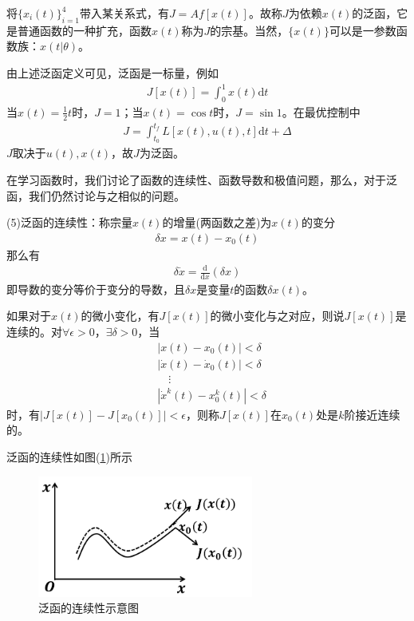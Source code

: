             将$\{x_i(t)\}_{i=1}^4$带入某关系式，有$J = Af[x(t)]$。故称$J$为依赖$x(t)$的泛函，它是普通函数的一种扩充，函数$x(t)$称为$J$的宗基。当然，$\{x(t)\}$可以是一参数函数族：$x(t|\theta)$。
            \par
            由上述泛函定义可见，泛函是一标量，例如
            \begin{align*}
            J[x(t)] = \int_0^1x(t)\mathrm{d}t
            \end{align*}
            当$x(t) = \frac{1}{2}t$时，$J=1$；当$x(t) = \cos t$时，$J = \sin 1$。在最优控制中
            \begin{align*}
            J = \int_{t_0}^{t_f}L[x(t),u(t),t]\mathrm{d}t + \Delta
            \end{align*}
            $J$取决于$u(t),x(t)$，故$J$为泛函。
            \par
            在学习函数时，我们讨论了函数的连续性、函数导数和极值问题，那么，对于泛函，我们仍然讨论与之相似的问题。
            \par
            (5)泛函的连续性：称宗量$x(t)$的增量(两函数之差)为$x(t)$的变分
            \begin{align*}
            \delta x = x(t) - x_0(t)
            \end{align*}
            那么有
            \begin{align*}
            \delta\dot{x} = \frac{\mathrm{d}}{\mathrm{d}x} (\delta x)
            \end{align*}
            即导数的变分等价于变分的导数，且$\delta x$是变量$t$的函数$\delta x(t)$。
            \begin{definition}[泛函的连续性]
            如果对于$x(t)$的微小变化，有$J[x(t)]$的微小变化与之对应，则说$J[x(t)]$是连续的。对$\forall \epsilon >0$，$\exists \delta >0$，当
            \begin{align*}
            & |x(t) - x_0(t)| < \delta\\
            & | \dot{x}(t) - \dot{x}_0(t) |<\delta\\
            & \quad \vdots\\
            & | \dot{x}^k(t) - x_0^k(t) | < \delta
            \end{align*}
            时，有$|J[x(t)] - J[x_0(t)]  |<\epsilon$，则称$J[x(t)]$在$x_0(t)$处是$k$阶接近连续的。
            \end{definition}
            \par
            泛函的连续性如图(\ref{fig:泛函的连续性示意图})所示
            \begin{figure}[H]
            \centering
            \includegraphics[height=4cm]{images/continuity_of_function_diagram.jpg}
            \caption{泛函的连续性示意图}
            \label{fig:泛函的连续性示意图}
            \end{figure}
